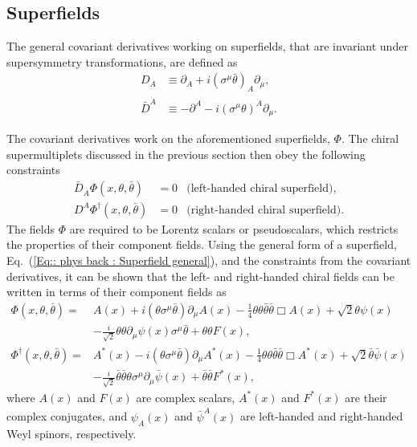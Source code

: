 \documentclass[twoside,english]{uiofysmaster}
\begin{document}
\subsection{Superfields}

The general covariant derivatives working on superfields, that are invariant under supersymmetry transformations, are defined as
\begin{align}\label{Eq:: phys back : susy covariant derivative D}
D_A & \equiv \partial_A + i (\sigma^{\mu} \bar{\theta})_A \partial_{\mu},\\
\bar{D}^{\dot{A}} & \equiv -\partial^{\dot{A}} - i (\sigma^{\mu} \theta)^{\dot{A}} \partial_{\mu}.\label{Eq:: phys back : susy covariant derivative Dbar}
\end{align}

The covariant derivatives work on the aforementioned superfields, $\Phi$. The chiral supermultiplets discussed in the previous section then obey the following constraints
\begin{align}
\bar{D}_{\dot{A}} \Phi (x, \theta, \bar{\theta}) &= 0 &\text{(left-handed chiral superfield)},\\
D^A \Phi^{\dagger} (x, \theta, \bar{\theta}) &= 0 &\text{(right-handed chiral superfield)}.
\end{align}
The fields $\Phi$ are required to be Lorentz scalars or pseudoscalars, which restricts the properties of their component fields. Using the general form of a superfield, Eq.~(\ref{Eq:: phys back : Superfield general}), and the constraints from the covariant derivatives, it can be shown that the left- and right-handed chiral fields can be written in terms of their component fields as  \cite{batzing2017lecture}
\begin{align}
\Phi (x, \theta, \bar{\theta}) =& A(x) + i (\theta \sigma^{\mu} \bar{\theta}) \partial_{\mu} A(x) - \frac{1}{4} \theta \theta \bar{\theta} \bar{\theta} \Box A(x) + \sqrt{2} \theta \psi (x)\nonumber \\ 
& - \frac{i}{\sqrt{2}} \theta \theta \partial_{\mu} \psi (x) \sigma^{\mu} \bar{\theta} + \theta \theta F(x),\\
\Phi^{\dagger} (x, \theta, \bar{\theta}) =& A^*(x) - i (\theta \sigma^{\mu} \bar{\theta}) \partial_{\mu} A^*(x) - \frac{1}{4} \theta \theta \bar{\theta} \bar{\theta} \Box A^*(x) + \sqrt{2} \bar{\theta} \bar{\psi} (x)\nonumber \\
& - \frac{i}{\sqrt{2}} \bar{\theta} \bar{\theta} \theta \sigma^{\mu} \partial_{\mu} \bar{\psi} (x)  + \bar{\theta} \bar{\theta} F^*(x),
\end{align}
where $A(x)$ and $F(x)$ are complex scalars, $A^*(x)$ and $F^*(x)$ are their complex conjugates, and $\psi_A(x)$ and $\bar{\psi}^{\dot{A}} (x)$ are left-handed and right-handed Weyl spinors, respectively. 
\end{document}
